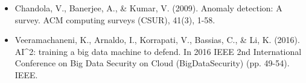 \documentclass[12pt]{article}
\begin{document}
\begin{itemize}
\item Chandola, V., Banerjee, A., & Kumar, V. (2009). Anomaly detection: A survey. ACM computing surveys (CSUR), 41(3), 1-58.
\end{itemize}

\begin{itemize}
\item Veeramachaneni, K., Arnaldo, I., Korrapati, V., Bassias, C., & Li, K. (2016). AI^2: training a big data machine to defend. In 2016 IEEE 2nd International Conference on Big Data Security on Cloud (BigDataSecurity) (pp. 49-54). IEEE.
\end{itemize}
\end{document}
